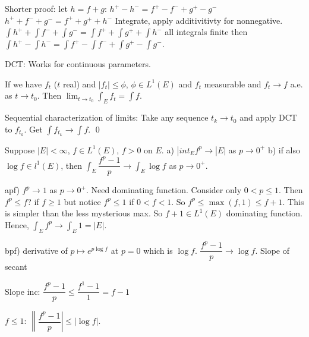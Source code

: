 
Shorter proof: let $h= f+g$:
$h^+ - h^-= f^+ - f^- + g^+ - g^-$
$h^+ + f^- + g^-= f^+ + g^+ + h^-$
Integrate, apply additivitivty for nonnegative.
$\int h^+ + \int f^- + \int g^-= \int f^+ + \int g^+ + \int h^-$
all integrals finite then 
$\int h^+ - \int h^- = \int f^+ - \int f^- + \int g^+ - \int g^-$. 



DCT: Works for continuous parameters.

If we have $f_t$ ($t$ real) and $|f_t| \leq \phi$, $\phi \in L^1(E)$ and $f_t$ measurable and $f_t \to f$ a.e. as $t \to t_0$. Then $\lim_{t \to t_0} \int_E f_t= \int f$. 

\pf Sequential characterization of limits: Take any sequence $t_k \to t_0$ and apply DCT to $f_{t_k}$. Get $\int f_{t_k} \to \int f$. \qed \\


\begin{ex}
Suppose $|E|<\infty$, $f \in L^1(E)$, $f>0$ on $E$.
a) $|int_E f^p \to |E|$ as $p \to 0^+$
b) if also $\log f \in l^1(E)$, then $\int_E \dfrac{f^p-1}{p} \to \int_E \log f$ as $p \to 0^+$.


apf) $f^p \to 1$ as $p \to 0^+$. Need dominating function. Consider only $0<p \leq 1$. Then $f^p \leq f$? if $f \geq 1$ but notice $f^p \leq 1$ if $0<f<1$. So $f^p \leq \max(f,1) \leq f+1$. This is simpler than the less mysterious max. So $f+1 \in L^1(E)$ dominating function. Hence, $\int_E f^p \to \int_E 1= |E|$. 

bpf) derivative of $p \mapsto e^{p \log f}$ at $p=0$ which is $\log f$. $\dfrac{f^p-1}{p} \to \log f$. Slope of secant 


Slope inc: $\dfrac{f^p-1}{p} \leq \dfrac{f^1-1}{1}= f-1$

$f \leq 1$: $\left\| \dfrac{f^p-1}{p} \right| \leq |\log f|$.

\end{ex}































